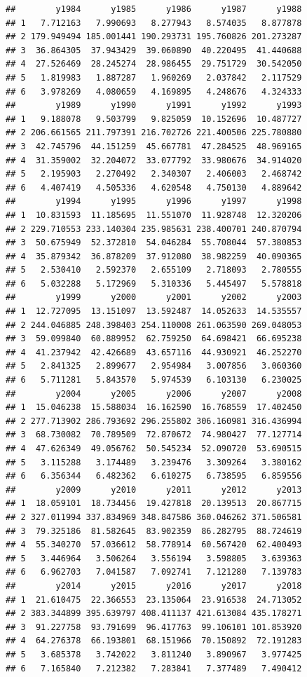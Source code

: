 \documentclass[
]{book}
\begin{document}
\begin{verbatim}
##        y1984      y1985      y1986      y1987      y1988
## 1   7.712163   7.990693   8.277943   8.574035   8.877878
## 2 179.949494 185.001441 190.293731 195.760826 201.273287
## 3  36.864305  37.943429  39.060890  40.220495  41.440688
## 4  27.526469  28.245274  28.986455  29.751729  30.542050
## 5   1.819983   1.887287   1.960269   2.037842   2.117529
## 6   3.978269   4.080659   4.169895   4.248676   4.324333
##        y1989      y1990      y1991      y1992      y1993
## 1   9.188078   9.503799   9.825059  10.152696  10.487727
## 2 206.661565 211.797391 216.702726 221.400506 225.780880
## 3  42.745796  44.151259  45.667781  47.284525  48.969165
## 4  31.359002  32.204072  33.077792  33.980676  34.914020
## 5   2.195903   2.270492   2.340307   2.406003   2.468742
## 6   4.407419   4.505336   4.620548   4.750130   4.889642
##        y1994      y1995      y1996      y1997      y1998
## 1  10.831593  11.185695  11.551070  11.928748  12.320206
## 2 229.710553 233.140304 235.985631 238.400701 240.870794
## 3  50.675949  52.372810  54.046284  55.708044  57.380853
## 4  35.879342  36.878209  37.912080  38.982259  40.090365
## 5   2.530410   2.592370   2.655109   2.718093   2.780555
## 6   5.032288   5.172969   5.310336   5.445497   5.578818
##        y1999      y2000      y2001      y2002      y2003
## 1  12.727095  13.151097  13.592487  14.052633  14.535557
## 2 244.046885 248.398403 254.110008 261.063590 269.048053
## 3  59.099840  60.889952  62.759250  64.698421  66.695238
## 4  41.237942  42.426689  43.657116  44.930921  46.252270
## 5   2.841325   2.899677   2.954984   3.007856   3.060360
## 6   5.711281   5.843570   5.974539   6.103130   6.230025
##        y2004      y2005      y2006      y2007      y2008
## 1  15.046238  15.588034  16.162590  16.768559  17.402450
## 2 277.713902 286.793692 296.255802 306.160981 316.436994
## 3  68.730082  70.789509  72.870672  74.980427  77.127714
## 4  47.626349  49.056762  50.545234  52.090720  53.690515
## 5   3.115288   3.174489   3.239476   3.309264   3.380162
## 6   6.356344   6.482362   6.610275   6.738595   6.859556
##        y2009      y2010      y2011      y2012      y2013
## 1  18.059101  18.734456  19.427818  20.139513  20.867715
## 2 327.011994 337.834969 348.847586 360.046262 371.506581
## 3  79.325186  81.582645  83.902359  86.282795  88.724619
## 4  55.340270  57.036612  58.778914  60.567420  62.400493
## 5   3.446964   3.506264   3.556194   3.598805   3.639363
## 6   6.962703   7.041587   7.092741   7.121280   7.139783
##        y2014      y2015      y2016      y2017      y2018
## 1  21.610475  22.366553  23.135064  23.916538  24.713052
## 2 383.344899 395.639797 408.411137 421.613084 435.178271
## 3  91.227758  93.791699  96.417763  99.106101 101.853920
## 4  64.276378  66.193801  68.151966  70.150892  72.191283
## 5   3.685378   3.742022   3.811240   3.890967   3.977425
## 6   7.165840   7.212382   7.283841   7.377489   7.490412
\end{verbatim}
\end{document}
